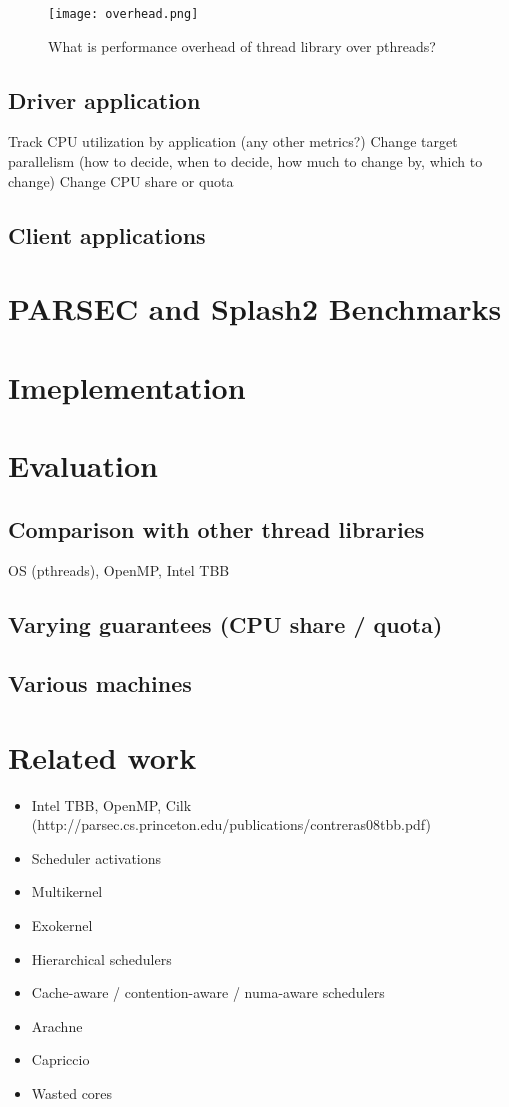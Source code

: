 \documentclass[10pt,preprint]{sigplanconf}
\begin{document}
\begin{figure}
\centering
  \texttt{[image: overhead.png]}
  \caption{What is performance overhead of thread library over pthreads?}
\end{figure}
\subsection{Driver application}
Track CPU utilization by application (any other metrics?)
Change target parallelism (how to decide, when to decide, how much to change by, which to change)
Change CPU share or quota
\subsection{Client applications}

\section{PARSEC and Splash2 Benchmarks}

\section{Imeplementation}

\section{Evaluation}
\subsection{Comparison with other thread libraries}
OS (pthreads), OpenMP, Intel TBB
\subsection{Varying guarantees (CPU share / quota)}

\subsection{Various machines}

\section{Related work}
\begin{itemize}
  \item Intel TBB, OpenMP, Cilk (http://parsec.cs.princeton.edu/publications/contreras08tbb.pdf)
  \item Scheduler activations
  \item Multikernel
  \item Exokernel
  \item Hierarchical schedulers
  \item Cache-aware / contention-aware / numa-aware schedulers
  \item Arachne
  \item Capriccio
  \item Wasted cores
\end{itemize}
\end{document}
